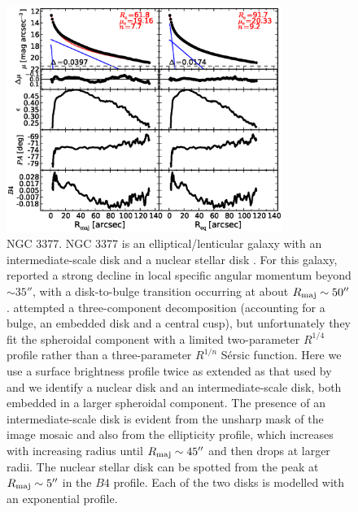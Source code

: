 \documentclass[preprint2]{emulateapj}
\newcommand{\fitfigurewidth}{0.8\textwidth}
\begin{document}
  \begin{figure}[h]
  \begin{center}
  \includegraphics[width=\fitfigurewidth]{images/n3377_1Dfit.eps}
  \caption{NGC 3377.
  NGC 3377 is an elliptical/lenticular galaxy with an intermediate-scale disk and a nuclear stellar disk \citep{ledo2010}. 
  For this galaxy, \citet{arnold2014} reported a strong decline in local specific angular momentum beyond $\sim 35''$, 
  with a disk-to-bulge transition occurring at about $R_{\rm maj} \sim 50''$.
  \citet{arnold2014} attempted a three-component decomposition (accounting for a bulge, an embedded disk and a central cusp), 
  but unfortunately they fit the spheroidal component with a limited two-parameter $R^{1/4}$ profile 
  rather than a three-parameter $R^{1/n}$ S\'ersic function.
  Here we use a surface brightness profile twice as extended as that used by \citet{arnold2014} 
  and we identify a nuclear disk and an intermediate-scale disk, both embedded in a larger spheroidal component.
  The presence of an intermediate-scale disk is evident from the unsharp mask of the image mosaic 
  and also from the ellipticity profile, which increases with increasing radius until $R_{\rm maj} \sim 45''$ 
  and then drops at larger radii.
  The nuclear stellar disk can be spotted from the peak at $R_{\rm maj} \sim 5''$ in the $B4$ profile.
  Each of the two disks is modelled with an exponential profile. 
  }
  \end{center}
  \end{figure}
  
\end{document}
